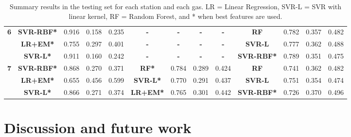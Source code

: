 \begin{table*}
{\begin{tabular}{|c|c|c|c|c|c|c|c|c|c|c|c|c|}
\multirow{3}{*}{\textbf{6}} & \textbf{SVR-RBF*} & 0.916          & 0.158        & 0.235         & \textbf{-}      & \textbf{-}     & \textbf{-}   & \textbf{-}    & \textbf{RF}      & 0.782                              & 0.357                            & 0.482                             \\
            & \textbf{LR+EM*}   & 0.755          & 0.297        & 0.401         & \textbf{-}      & \textbf{-}     & \textbf{-}   & \textbf{-}    & \textbf{SVR-L}   & 0.777                              & 0.362                            & 0.488                             \\
            & \textbf{SVR-L*}   & 0.911          & 0.160        & 0.242         & \textbf{-}      & \textbf{-}     & \textbf{-}   & \textbf{-}    & \textbf{SVR-RBF*} & 0.789                              & 0.351                            & 0.475                             \\\hline
\multirow{3}{*}{\textbf{7}} & \textbf{SVR-RBF*} & 0.868          & 0.270        & 0.371         & \textbf{RF*}    & 0.784          & 0.289        & 0.424         & \textbf{RF}      & 0.741                              & 0.362                            & 0.482                             \\
            & \textbf{LR+EM*}   & 0.655          & 0.456        & 0.599         & \textbf{SVR-L*} & 0.770          & 0.291        & 0.437         & \textbf{SVR-L}   & 0.751                              & 0.354                            & 0.474                             \\
            & \textbf{SVR-L*}   & 0.866          & 0.271        & 0.374
            & \textbf{LR+EM*} & 0.765          & 0.301        & 0.442
            & \textbf{SVR-RBF*} & 0.726                              & 0.370
            & 0.496 \\\hline
\end{tabular}
    }
    \caption{Summary results in the testing set for each station and each gas. LR = Linear Regression, SVR-L = SVR with linear kernel, RF = Random Forest, and * when best features are used.}
    \label{tab:summary-results}
\end{table*}

\section{Discussion and future work}
\label{sec:discussion}

